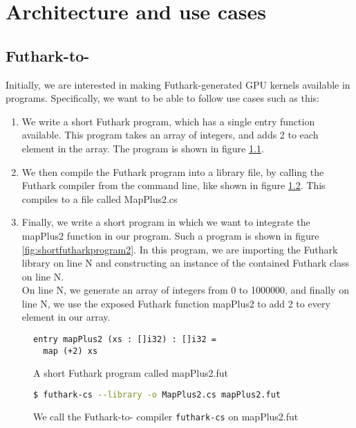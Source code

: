 \chapter{Architecture and use cases}
\section{Futhark-to-\csharp{}}
Initially, we are interested in making Futhark-generated GPU kernels available
in \csharp{} programs. Specifically, we want to be able to follow use cases such
as this:
\begin{enumerate}
\item We write a short Futhark program, which has a single entry function
  available. This program takes an array of integers, and
adds 2 to each element in the array. The program is shown in figure \ref{fig:shortfutharkprogram0}. 
\item We then compile the Futhark program into a library file, by calling the
  Futhark compiler from the command line, like shown in figure \ref{fig:shortfutharkprogram1}.
This compiles  to a \csharp{} file called MapPlus2.cs

\item Finally, we write a short \csharp{} program in which we want to integrate
  the mapPlus2 function in our program. Such a program is shown in figure \ref{fig:shortfutharkprogram2}.
  In this program, we are importing the Futhark library on line N and constructing
  an instance of the contained Futhark class on line N.\\
  On line N, we generate an array of integers from 0 to 1000000, and finally
  on line N, we use the exposed Futhark function mapPlus2 to add 2 to every
  element in our array.
\end{enumerate}
\begin{figure}[H]
  \centering
  \begin{lstlisting}[language=Futhark]
entry mapPlus2 (xs : []i32) : []i32 =
  map (+2) xs
  \end{lstlisting}
  \caption{A short Futhark program called mapPlus2.fut}
  \label{fig:shortfutharkprogram0}
\end{figure}

\begin{figure}[H]
  \centering
  \begin{lstlisting}[language=bash]
$ futhark-cs --library -o MapPlus2.cs mapPlus2.fut
  \end{lstlisting}
  \caption{We call the Futhark-to-\csharp{} compiler \texttt{futhark-cs} on
    mapPlus2.fut}
  \label{fig:shortfutharkprogram1}
\end{figure}

